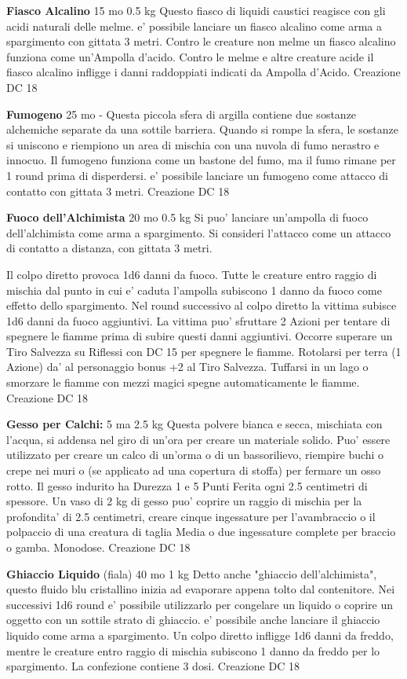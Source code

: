 \documentclass[a4paper,11pt,twoside,openany]{dndbook}
\begin{document}
{\textbf{Fiasco Alcalino} 15 mo 0.5 kg Questo fiasco di liquidi caustici reagisce con gli acidi naturali delle melme. e' possibile lanciare un fiasco alcalino come arma a spargimento con gittata 3 metri. Contro le creature non melme un fiasco alcalino funziona come un'Ampolla d'acido. Contro le melme e altre creature acide il fiasco alcalino infligge i danni raddoppiati indicati da Ampolla d'Acido. Creazione DC 18

\textbf{Fumogeno} 25 mo - Questa piccola sfera di argilla contiene due sostanze alchemiche separate da una sottile barriera. Quando si rompe la sfera, le sostanze si uniscono e riempiono un area di mischia con una nuvola di fumo nerastro e innocuo. Il fumogeno funziona come un bastone del fumo, ma il fumo rimane per 1 round prima di disperdersi. e' possibile lanciare un fumogeno come attacco di contatto con gittata 3 metri. Creazione DC 18

\textbf{Fuoco dell'Alchimista} 20 mo 0.5 kg Si puo' lanciare un'ampolla di fuoco dell'alchimista come arma a spargimento. Si consideri l'attacco come un attacco di contatto a distanza, con gittata 3 metri.

Il colpo diretto provoca 1d6 danni da fuoco. Tutte le creature entro raggio di mischia dal punto in cui e' caduta l'ampolla subiscono 1 danno da fuoco come effetto dello spargimento. Nel round successivo al colpo diretto la vittima subisce 1d6 danni da fuoco aggiuntivi. La vittima puo' sfruttare 2 Azioni per tentare di spegnere le fiamme prima di subire questi danni aggiuntivi. Occorre superare un Tiro Salvezza su Riflessi con DC 15 per spegnere le fiamme. Rotolarsi per terra (1 Azione) da' al personaggio bonus +2 al Tiro Salvezza. Tuffarsi in un lago o smorzare le fiamme con mezzi magici spegne automaticamente le fiamme. Creazione DC 18

\textbf{Gesso per Calchi:} 5 ma 2.5 kg Questa polvere bianca e secca, mischiata con l’acqua, si addensa nel giro di un’ora per creare un materiale solido. Puo' essere utilizzato per creare un calco di un’orma o di un bassorilievo, riempire buchi o crepe nei muri o (se applicato ad una copertura di stoffa) per fermare un osso rotto. Il gesso indurito ha Durezza 1 e 5 Punti Ferita ogni 2.5 centimetri di spessore. Un vaso di 2 kg di gesso puo' coprire un raggio di mischia per la profondita' di 2.5 centimetri, creare cinque ingessature per l’avambraccio o il polpaccio di una creatura di taglia Media o due ingessature complete per braccio o gamba. Monodose. Creazione DC 18

\textbf{Ghiaccio Liquido} (fiala) 40 mo 1 kg Detto anche "ghiaccio dell'alchimista", questo fluido blu cristallino inizia ad evaporare appena tolto dal contenitore. Nei successivi 1d6 round e' possibile utilizzarlo per congelare un liquido o coprire un oggetto con un sottile strato di ghiaccio. e' possibile anche lanciare il ghiaccio liquido come arma a spargimento. Un colpo diretto infligge 1d6 danni da freddo, mentre le creature entro raggio di mischia subiscono 1 danno da freddo per lo spargimento. La confezione contiene 3 dosi. Creazione DC 18

}
\end{document}
